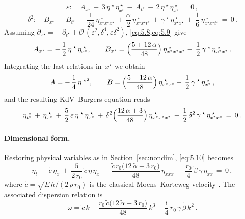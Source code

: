 \documentclass[alpha-refs, 12pt]{wiley-article}
\renewcommand{\O}{\mathcal{O}}
\newcommand{\ui}{\mathrm{i}}
\newcommand{\eps}{\varepsilon}
\begin{document}
\begin{equation}\label{eq:5.8}
  \eps:\quad
  A_{x^{\star}}\,+\,3\,\eta^{\;\star}\,\eta^{\;\star}_{x^{\star}}\,-\,A_{t^{\star}}\,-\,2\,\eta^{\;\star}\,\eta^{\;\star}_{x^{\star}}\,=\,0\,,
\end{equation}
\begin{equation}\label{eq:5.9}
  \delta^{2}:\quad
  B_{x^{\star}}\,-\,B_{t^{\star}}\,-\,\frac{1}{24}\,\eta^{\;\star}_{x^{\star}x^{\star}x^{\star}}\,+\,\frac{\alpha}{2}\,
  \eta^{\;\star}_{x^{\star}x^{\star}t^{\star}}
  \,+\,\gamma^{\;\star}\,\eta^{\;\star}_{x^{\star}x^{\star}}\,+\,\frac{1}{6}\,\eta^{\;\star}_{x^{\star}x^{\star}t^{\star}}\,=\,0\,.
\end{equation}
Assuming $\partial_{x^{\star}} = -\,\partial_{t^{\star}} + \O\,(\eps^{2},\delta^{4},\eps\delta^{2})$, \cref{eq:5.8,eq:5.9} give
\begin{equation*}
  A_{x^{\star}}=-\,\frac{1}{2}\,\eta^{\;\star}\,\eta^{\;\star}_{x^{\star}}, \qquad
  B_{x^{\star}}=\Bigl(\frac{5+12\,\alpha}{48}\Bigr)\,\eta^{\;\star}_{x^{\star}x^{\star}x^{\star}}
  -\,\frac{1}{2}\,\gamma^{\;\star}\,\eta^{\;\star}_{x^{\star}x^{\star}}\,.
\end{equation*}
Integrating the last relations in~$x^{\star}$ we obtain
\begin{equation*}
  A=-\,\frac{1}{4}\,{\eta^{\;\star}}^{2},\qquad
  B=\Bigl(\frac{5+12\,\alpha}{48}\Bigr)\,\eta^{\;\star}_{x^{\star}x^{\star}}
  -\,\frac{1}{2}\,\gamma^{\;\star}\,\eta^{\;\star}_{x^{\star}}\,,
\end{equation*}
and the resulting KdV--Burgers equation reads
\begin{equation}\label{eq:5.10}
  \eta^{\;\star}_{t^{\star}}\,+\,\eta^{\;\star}_{x^{\star}}
  \,+\,\frac{5}{2}\,\eps\,\eta^{\;\star}\,\eta^{\;\star}_{x^{\star}}
  \,+\,\delta^{2}\Bigl(\frac{12\,\alpha+3}{48}\Bigr)\,\eta^{\;\star}_{x^{\star}x^{\star}x^{\star}}
  \,-\,\frac{1}{2}\,\delta^{2}\,\gamma^{\;\star}\,\eta^{\;\star}_{x^{\star}x^{\star}}\,=\,0\,.
\end{equation}

\paragraph{Dimensional form.} Restoring physical variables as in Section~\ref{sec:nondim}, \cref{eq:5.10} becomes
\begin{equation}\label{eq:KdVdim}
  \eta_{t}\,+\,\tilde{c}\,\eta_{x}\,+\,\frac{5}{2\,r_{0}}\,\tilde{c}\,\eta\,\eta_{x}\, + \,\frac{\tilde{c}\,r_{0}\bigl(12\,\tilde{\alpha}+3\,r_{0}\bigr)}{48}\,\eta_{xxx}\, - \,\frac{r_{0}}{4}\,\tilde{\beta}\,\gamma\,\eta_{xx}\,=\,0\,,
\end{equation}
where $\tilde{c}=\sqrt{E\,h/(2\,\rho\,r_{0})}$ is the classical Moens--Korteweg velocity
\cite{Fung1997a}. The associated dispersion relation is
\begin{equation*}
  \omega=\tilde{c}\,k - \frac{r_{0}\,\tilde{c}\bigl(12\,\tilde{\alpha}+3\,r_{0}\bigr)}{48}\,k^{3} - \frac{\ui}{4}\,r_{0}\,\gamma\,\tilde{\beta}\,k^{2}\,.
\end{equation*}
\end{document}

